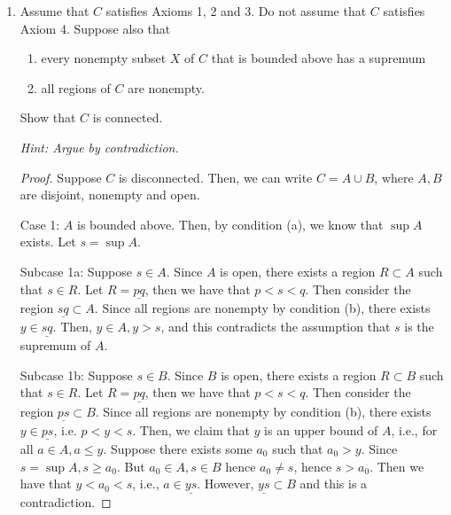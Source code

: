 \documentclass[11pt]{article}
\renewcommand{\emptyset}{\O}
\renewcommand{\_}[1]{\underline{ #1 }}
\theoremstyle{definition}
\numberwithin{equation}{subsection}
\begin{document}
\begin{enumerate}
\begin{proof}
$u \in A'$ and $v \in B'$, hence $A'$ and $B'$ are nonempty.

Consider $y \in A \cap \underline{av}$. $A$ and $B$ are disjoint, hence $y \notin B \cap \underline{ub}$, and $\underline{av} \cap \underline{vb} = \emptyset$, hence $y \notin B'$. Next consider $y \in \underline{au}$. We know that $\underline{au} \cap \underline{ub} = \emptyset$ and $\underline{au} \cap \underline{vb} = \emptyset$, hence $y \notin B'$. Thus, $A'$ and $B'$ are disjoint.

Hence, if $\underline{ab}$ is disconnected, then the continuum $C$ must be disconnected and this contradicts Axiom 4. Hence, $\underline{ab}$ is connected. This satisfies Axiom 4.

This completes the proof.

\renewcommand\qedsymbol{QED}
\end{proof}


\item
Assume that $C$ satisfies Axioms 1, 2 and 3. Do not assume that $C$ satisfies Axiom 4. Suppose also that
\begin{enumerate}
\item every nonempty subset $X$ of $C$ that is bounded above has a supremum 
\item all regions of $C$ are nonempty.
\end{enumerate}
Show that $C$ is connected. 

{\it Hint: Argue by contradiction. }

\begin{proof}
Suppose $C$ is disconnected. Then, we can write $C = A \cup B$, where $A,B$ are disjoint, nonempty and open.

Case 1: $A$ is bounded above. Then, by condition (a), we know that $\sup A$ exists. Let $s = \sup A$.

Subcase 1a: Suppose $s \in A$. Since $A$ is open, there exists a region $R \subset A$ such that $s \in R$. Let $R = \_{pq}$, then we have that $p<s<q$. Then consider the region $\_{sq} \subset A$. Since all regions are nonempty by condition (b), there exists $y \in \_{sq}$. Then, $y \in A, y>s$, and this contradicts the assumption that $s$ is the supremum of $A$.

Subcase 1b: Suppose $s \in B$. Since $B$ is open, there exists a region $R \subset B$ such that $s \in R$. Let $R = \_{pq}$, then we have that $p<s<q$. Then consider the region $\_{ps} \subset B$. Since all regions are nonempty by condition (b), there exists $y \in \_{ps}$, i.e. $p<y<s$. Then, we claim that $y$ is an upper bound of $A$, i.e., for all $a \in A, a \leq y$. Suppose there exists some $a_0$ such that $a_0 > y$. Since $s = \sup A, s \geq a_0$. But $a_0 \in A, s \in B$ hence $a_0 \neq s$, hence $s > a_0$. Then we have that $y<a_0<s$, i.e., $a \in \_{ys}$. However, $\_{ys} \subset B$ and this is a contradiction. 


\end{proof}
\end{enumerate}
\end{document}
